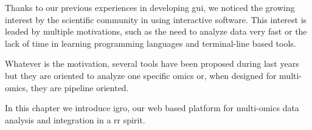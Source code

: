 Thanks to our previous experiences \cite{russo2015advantages} in developing \gls{gui}, we noticed the growing interest by the scientific community in using interactive software.
This interest is leaded by multiple motivations, such as the need to analyze data very fast or the lack of time in learning programming languages and terminal-line based tools.

Whatever is the motivation, several tools \cite{Poplawski2016} have been proposed during last years but they are oriented to analyze one specific omics or, when designed for multi-omics, they are pipeline oriented. 

In this chapter we introduce \gls{igro}, our web based platform for multi-omics data analysis and integration in a \gls{rr} spirit.